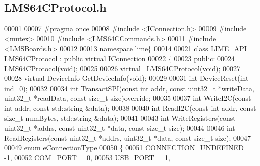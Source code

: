 \subsection{L\+M\+S64\+C\+Protocol.\+h}
\label{LMS64CProtocol_8h_source}

\begin{DoxyCode}
00001 
00007 \textcolor{preprocessor}{#pragma once}
00008 \textcolor{preprocessor}{#include <IConnection.h>}
00009 \textcolor{preprocessor}{#include <mutex>}
00010 \textcolor{preprocessor}{#include <LMS64CCommands.h>}
00011 \textcolor{preprocessor}{#include <LMSBoards.h>}
00012 
00013 \textcolor{keyword}{namespace }lime\{
00014 
00021 \textcolor{keyword}{class }LIME_API LMS64CProtocol : \textcolor{keyword}{public} \textcolor{keyword}{virtual} IConnection
00022 \{
00023 \textcolor{keyword}{public}:
00024     LMS64CProtocol(\textcolor{keywordtype}{void});
00025 
00026     \textcolor{keyword}{virtual} ~LMS64CProtocol(\textcolor{keywordtype}{void});
00027 
00028     \textcolor{keyword}{virtual} DeviceInfo GetDeviceInfo(\textcolor{keywordtype}{void});
00029 
00031     \textcolor{keywordtype}{int} DeviceReset(\textcolor{keywordtype}{int} ind=0);
00032 
00034     \textcolor{keywordtype}{int} TransactSPI(\textcolor{keyword}{const} \textcolor{keywordtype}{int} addr, \textcolor{keyword}{const} uint32\_t *writeData, uint32\_t *readData, \textcolor{keyword}{const} \textcolor{keywordtype}{size\_t} 
      size)\textcolor{keyword}{override};
00035 
00037     \textcolor{keywordtype}{int} WriteI2C(\textcolor{keyword}{const} \textcolor{keywordtype}{int} addr, \textcolor{keyword}{const} std::string &data);
00038 
00040     \textcolor{keywordtype}{int} ReadI2C(\textcolor{keyword}{const} \textcolor{keywordtype}{int} addr, \textcolor{keyword}{const} \textcolor{keywordtype}{size\_t} numBytes, std::string &data);
00041 
00043     \textcolor{keywordtype}{int} WriteRegisters(\textcolor{keyword}{const} uint32\_t *addrs, \textcolor{keyword}{const} uint32\_t *data, \textcolor{keyword}{const} \textcolor{keywordtype}{size\_t} size);
00044 
00046     \textcolor{keywordtype}{int} ReadRegisters(\textcolor{keyword}{const} uint32\_t *addrs, uint32\_t *data, \textcolor{keyword}{const} \textcolor{keywordtype}{size\_t} size);
00047 
00049     \textcolor{keyword}{enum} eConnectionType
00050     \{
00051         CONNECTION\_UNDEFINED = -1,
00052         COM\_PORT = 0,
00053         USB\_PORT = 1,

\end{DoxyCode}
